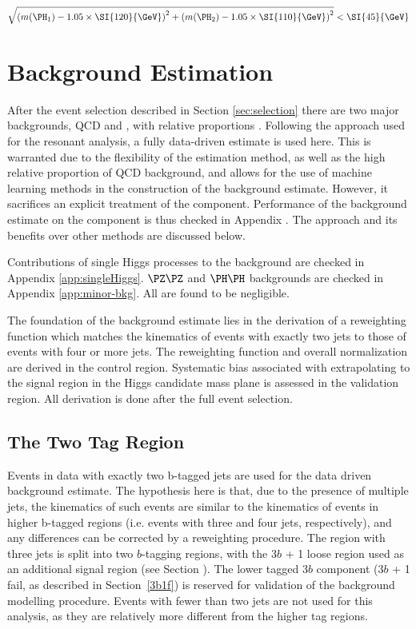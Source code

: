 \begin{equation}
	\label{eqn:ctrl-reg-def}
	\sqrt{\qty(\mh1 - 1.05 \times \SI{120}{\GeV})^{2} + \qty(\mh2 - 1.05 \times
		\SI{110}{\GeV})^{2}} < \SI{45}{\GeV}
\end{equation}

\section{Background Estimation}
After the event selection described in Section \ref{sec:selection} there are
two major backgrounds, QCD and \ttbar, with relative proportions . Following the approach used for the 
resonant analysis, a fully data-driven estimate is used here. This is warranted due to 
the flexibility of the estimation method, as well as the high relative proportion of 
QCD background, and allows for the use of machine learning methods in the construction of
the background estimate. However, it sacrifices an explicit treatment of the
\ttbar component. Performance of the background estimate on the \ttbar component
is thus checked in Appendix . The approach and
its benefits over other methods are discussed below.

Contributions of single Higgs processes to the background are checked in 
Appendix \ref{app:singleHiggs}. $\PZ\PZ$ and $\higgs\higgs$ backgrounds are checked 
in Appendix \ref{app:minor-bkg}. All are found to be negligible.

The foundation of the background estimate lies in the derivation of a
reweighting function which matches the kinematics of events with exactly two
\btagged jets to those of events with four or more \btagged jets. The
reweighting function and overall normalization are derived in the control
region. Systematic bias associated with extrapolating to the signal region in
the Higgs candidate mass plane is assessed in the validation region. All
derivation is done after the full event selection.

\subsection{The Two Tag Region}

Events in data with exactly two b-tagged jets are used for the data driven 
background estimate. The hypothesis here is that, due to the presence of 
multiple \btagged jets, the kinematics of such events are similar to the 
kinematics of events in higher b-tagged regions (i.e. events with three and 
four \btagged jets, respectively), and any differences can be corrected by a 
reweighting procedure. The region with three \btagged jets is split into 
two $b$-tagging regions, with the 3$b$ + 1 loose region used as an additional signal 
region (see Section ). The lower tagged 3$b$ component 
(3$b$ + 1 fail, as described in Section~\ref{3b1f}) is reserved for validation
of the background modelling procedure. Events with fewer than two \btagged jets are not 
used for this analysis, as they are relatively more different from the higher tag regions.

